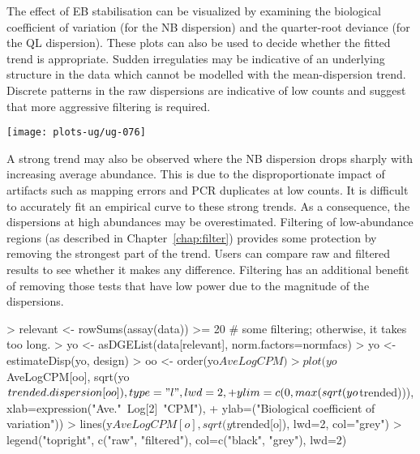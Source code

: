 \documentclass[12pt]{report}
\renewenvironment{Schunk}{\vspace{0pt}}{\vspace{0pt}}
\begin{document}
The effect of EB stabilisation can be visualized by examining the biological coefficient of variation (for the NB dispersion) and the quarter-root deviance (for the QL dispersion). 
These plots can also be used to decide whether the fitted trend is appropriate. 
Sudden irregulaties may be indicative of an underlying structure in the data which cannot be modelled with the mean-dispersion trend. 
Discrete patterns in the raw dispersions are indicative of low counts and suggest that more aggressive filtering is required.

\begin{Schunk}
\end{Schunk}

\begin{center}
\texttt{[image: plots-ug/ug-076]}
\end{center}

A strong trend may also be observed where the NB dispersion drops sharply with increasing average abundance.
This is due to the disproportionate impact of artifacts such as mapping errors and PCR duplicates at low counts. 
It is difficult to accurately fit an empirical curve to these strong trends.  
As a consequence, the dispersions at high abundances may be overestimated. 
Filtering of low-abundance regions (as described in Chapter~\ref{chap:filter}) provides some protection by removing the strongest part of the trend.
Users can compare raw and filtered results to see whether it makes any difference.
Filtering has an additional benefit of removing those tests that have low power due to the magnitude of the dispersions.

\begin{Schunk}
\begin{Sinput}
> relevant <- rowSums(assay(data)) >= 20 # some filtering; otherwise, it takes too long.
> yo <- asDGEList(data[relevant], norm.factors=normfacs)
> yo <- estimateDisp(yo, design)
> oo <- order(yo$AveLogCPM)
> plot(yo$AveLogCPM[oo], sqrt(yo$trended.dispersion[oo]), type="l", lwd=2,
+   ylim=c(0, max(sqrt(yo$trended))), xlab=expression("Ave."~Log[2]~"CPM"), 
+   ylab=("Biological coefficient of variation"))
> lines(y$AveLogCPM[o], sqrt(y$trended[o]), lwd=2, col="grey")
> legend("topright", c("raw", "filtered"), col=c("black", "grey"), lwd=2)
\end{Sinput}
\end{Schunk}
\end{document}
